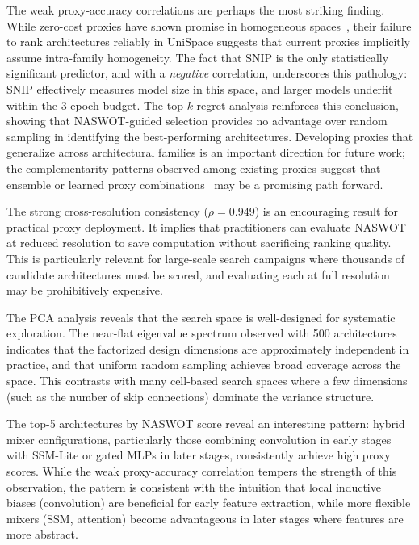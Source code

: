 \documentclass[10pt,twocolumn,letterpaper]{article}
\newcommand{\method}{UniSpace\xspace}
\newcommand{\naswot}{NASWOT\xspace}
\begin{document}
The weak proxy-accuracy correlations are perhaps the most striking finding. While zero-cost proxies have shown promise in homogeneous spaces~\cite{abdelfattah2021zerocost,mellor2021naswot}, their failure to rank architectures reliably in \method suggests that current proxies implicitly assume intra-family homogeneity. The fact that SNIP is the only statistically significant predictor, and with a \emph{negative} correlation, underscores this pathology: SNIP effectively measures model size in this space, and larger models underfit within the 3-epoch budget. The top-$k$ regret analysis reinforces this conclusion, showing that \naswot-guided selection provides no advantage over random sampling in identifying the best-performing architectures. Developing proxies that generalize across architectural families is an important direction for future work; the complementarity patterns observed among existing proxies suggest that ensemble or learned proxy combinations~\cite{lee2024aznas,shu2022unifying} may be a promising path forward.

The strong cross-resolution consistency ($\rho = 0.949$) is an encouraging result for practical proxy deployment. It implies that practitioners can evaluate \naswot at reduced resolution to save computation without sacrificing ranking quality. This is particularly relevant for large-scale search campaigns where thousands of candidate architectures must be scored, and evaluating each at full resolution may be prohibitively expensive.

The PCA analysis reveals that the search space is well-designed for systematic exploration. The near-flat eigenvalue spectrum observed with 500 architectures indicates that the factorized design dimensions are approximately independent in practice, and that uniform random sampling achieves broad coverage across the space. This contrasts with many cell-based search spaces where a few dimensions (such as the number of skip connections) dominate the variance structure.

The top-5 architectures by \naswot score reveal an interesting pattern: hybrid mixer configurations, particularly those combining convolution in early stages with SSM-Lite or gated MLPs in later stages, consistently achieve high proxy scores. While the weak proxy-accuracy correlation tempers the strength of this observation, the pattern is consistent with the intuition that local inductive biases (convolution) are beneficial for early feature extraction, while more flexible mixers (SSM, attention) become advantageous in later stages where features are more abstract.
\end{document}
